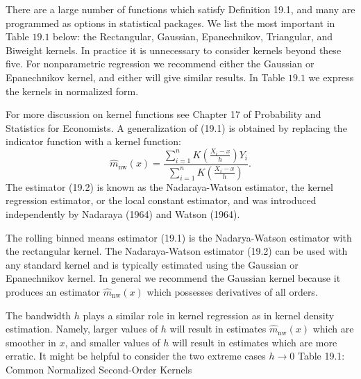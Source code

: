 \documentclass[10pt]{article}
\begin{document}
There are a large number of functions which satisfy Definition 19.1, and many are programmed as options in statistical packages. We list the most important in Table $19.1$ below: the Rectangular, Gaussian, Epanechnikov, Triangular, and Biweight kernels. In practice it is unnecessary to consider kernels beyond these five. For nonparametric regression we recommend either the Gaussian or Epanechnikov kernel, and either will give similar results. In Table $19.1$ we express the kernels in normalized form.

For more discussion on kernel functions see Chapter 17 of Probability and Statistics for Economists. A generalization of (19.1) is obtained by replacing the indicator function with a kernel function:
$$
\widehat{m}_{\mathrm{nw}}(x)=\frac{\sum_{i=1}^{n} K\left(\frac{X_{i}-x}{h}\right) Y_{i}}{\sum_{i=1}^{n} K\left(\frac{X_{i}-x}{h}\right)} .
$$
The estimator (19.2) is known as the Nadaraya-Watson estimator, the kernel regression estimator, or the local constant estimator, and was introduced independently by Nadaraya (1964) and Watson (1964).

The rolling binned means estimator (19.1) is the Nadarya-Watson estimator with the rectangular kernel. The Nadaraya-Watson estimator (19.2) can be used with any standard kernel and is typically estimated using the Gaussian or Epanechnikov kernel. In general we recommend the Gaussian kernel because it produces an estimator $\widehat{m}_{\mathrm{nw}}(x)$ which possesses derivatives of all orders.

The bandwidth $h$ plays a similar role in kernel regression as in kernel density estimation. Namely, larger values of $h$ will result in estimates $\widehat{m}_{\mathrm{nw}}(x)$ which are smoother in $x$, and smaller values of $h$ will result in estimates which are more erratic. It might be helpful to consider the two extreme cases $h \rightarrow 0$ Table 19.1: Common Normalized Second-Order Kernels
\end{document}
